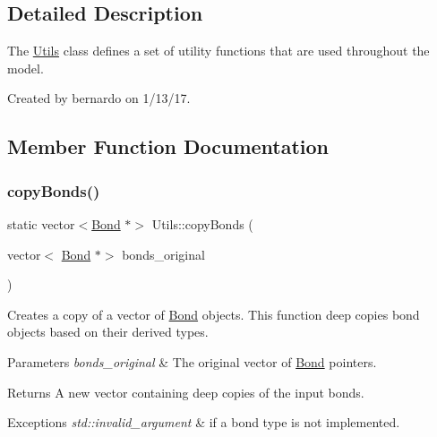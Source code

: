 \subsection{Detailed Description}
The \mbox{\hyperlink{classUtils}{Utils}} class defines a set of utility functions that are used throughout the model. 

Created by bernardo on 1/13/17. 

\subsection{Member Function Documentation}
\mbox{\label{classUtils_af59616433568dbc50e28290524f40faa}} 
\subsubsection{\texorpdfstring{copy\+Bonds()}{copyBonds()}}
{\footnotesize\ttfamily static vector$<$\mbox{\hyperlink{classBond}{Bond}} $\ast$$>$ Utils\+::copy\+Bonds (\begin{DoxyParamCaption}\item[{vector$<$ \mbox{\hyperlink{classBond}{Bond}} $\ast$$>$}]{bonds\+\_\+original }\end{DoxyParamCaption})\hspace{0.3cm}{\ttfamily [static]}}



Creates a copy of a vector of {\ttfamily \mbox{\hyperlink{classBond}{Bond}}} objects. This function deep copies bond objects based on their derived types. 


\begin{DoxyParams}{Parameters}
{\em bonds\+\_\+original} & The original vector of {\ttfamily \mbox{\hyperlink{classBond}{Bond}}} pointers.\\
\hline
\end{DoxyParams}
\begin{DoxyReturn}{Returns}
A new vector containing deep copies of the input bonds.
\end{DoxyReturn}

\begin{DoxyExceptions}{Exceptions}
{\em std\+::invalid\+\_\+argument} & if a bond type is not implemented. \\
\hline
\end{DoxyExceptions}
\mbox{\label{classUtils_ab291735d88ca704e9317edf259b6a5ab}} 
